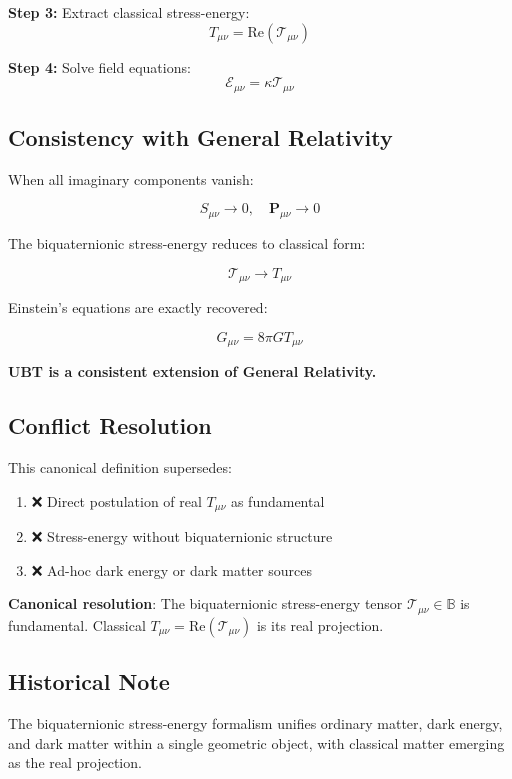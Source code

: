 \textbf{Step 3:} Extract classical stress-energy:
\begin{equation}
T_{\mu\nu} = \text{Re}(\mathcal{T}_{\mu\nu})
\end{equation}

\textbf{Step 4:} Solve field equations:
\begin{equation}
\mathcal{E}_{\mu\nu} = \kappa \mathcal{T}_{\mu\nu}
\end{equation}

\subsection{Consistency with General Relativity}

When all imaginary components vanish:

\begin{equation}
S_{\mu\nu} \to 0, \quad \mathbf{P}_{\mu\nu} \to 0
\end{equation}

The biquaternionic stress-energy reduces to classical form:

\begin{equation}
\mathcal{T}_{\mu\nu} \to T_{\mu\nu}
\end{equation}

Einstein's equations are exactly recovered:

\begin{equation}
G_{\mu\nu} = 8\pi G T_{\mu\nu}
\end{equation}

\textbf{UBT is a consistent extension of General Relativity.}

\subsection{Conflict Resolution}

This canonical definition supersedes:

\begin{enumerate}
    \item ❌ Direct postulation of real $T_{\mu\nu}$ as fundamental
    \item ❌ Stress-energy without biquaternionic structure
    \item ❌ Ad-hoc dark energy or dark matter sources
\end{enumerate}

\textbf{Canonical resolution}: The biquaternionic stress-energy tensor $\mathcal{T}_{\mu\nu} \in \mathbb{B}$ is fundamental. Classical $T_{\mu\nu} = \text{Re}(\mathcal{T}_{\mu\nu})$ is its real projection.

\subsection{Historical Note}

The biquaternionic stress-energy formalism unifies ordinary matter, dark energy, and dark matter within a single geometric object, with classical matter emerging as the real projection.

